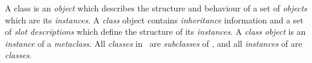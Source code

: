 \begin{optDefinition}
\begin{definitions}
     A class is an {\em object} which
    describes the structure and behaviour of a set of {\em objects} which are
    its {\em instances}.  A {\em class} object contains {\em inheritance}
    information and a set of {\em slot descriptions} which define the structure
    of its {\em instances}.  A {\em class} {\em object} is an {\em instance} of
    a {\em metaclass}.  All {\em classes} in \eulisp\ are {\em subclasses} of
    {}, and all {\em instances} of {} are {\em classes}.


\end{definitions}
\end{optDefinition}
